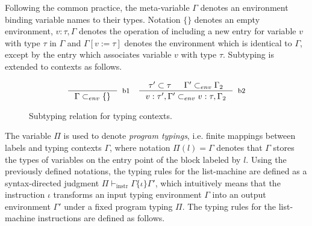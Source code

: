 \documentclass[review]{elsarticle}
\theoremstyle{definition}
\begin{document}
Following the common practice, the meta-variable $\Gamma$ denotes an
environment binding variable names to their types. Notation $\{\}$ denotes an empty environment, $v : \tau , \Gamma$
denotes the operation of including a new entry for variable $v$ with type $\tau$
in $\Gamma$ and $\Gamma [v := \tau]$ denotes the environment which is identical to $\Gamma$, except
by the entry which associates variable $v$ with type $\tau$.
Subtyping is extended to contexts as follows.
\begin{figure}[H]
\[
\begin{array}{cc}
  \inference{}
            {\Gamma \subset_{env} \{\}}[b1]
  &
  \inference{\tau' \subset \tau & \Gamma' \subset_{env} \Gamma_2}
            {v : \tau' , \Gamma' \subset_{env} v : \tau , \Gamma_2}
            [b2]
\end{array}
\]
\centering
\caption{Subtyping relation for typing contexts.}
\label{fig:subtyping-context}
\end{figure}
The variable $\Pi$ is used to denote \emph{program typings}, i.e. finite mappings between
labels and typing contexts $\Gamma$, where notation $\Pi(l) = \Gamma$ denotes that
$\Gamma$ stores the types of variables on the entry point of the block labeled by $l$.
Using the previously defined notations, the typing rules for the list-machine are defined
as a syntax-directed judgment $\Pi \vdash_{\text{instr}} \Gamma \{ \iota \} \Gamma'$,
which intuitively means that the instruction $\iota$ transforms an input typing environment
$\Gamma$ into an output environment $\Gamma'$ under a fixed program typing $\Pi$. The typing
rules for the list-machine instructions are defined as follows.
\end{document}
